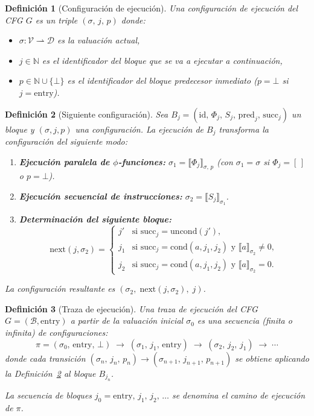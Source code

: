 \documentclass[12pt, a4paper]{article}
\newtheorem{definition}{Definición}[section]
\begin{document}
\begin{definition}[Configuración de ejecución]
\label{def:configuracion}
Una \emph{configuración de ejecución} del CFG $G$ es un triple
$(\sigma,\, j,\, p)$ donde:
\begin{itemize}
  \item $\sigma : \mathcal{V} \rightharpoonup \mathcal{D}$ es la valuación actual,
  \item $j \in \mathbb{N}$ es el identificador del bloque que se va a ejecutar a continuación,
  \item $p \in \mathbb{N} \cup \{\bot\}$ es el identificador del bloque predecesor inmediato
    ($p = \bot$ si $j = \mathrm{entry}$).
\end{itemize}
\end{definition}

\begin{definition}[Siguiente configuración]
\label{def:siguiente}
Sea $B_j = (\mathrm{id},\, \Phi_j,\, S_j,\, \mathrm{pred}_j,\, \mathrm{succ}_j)$ un bloque y
$(\sigma, j, p)$ una configuración. La \emph{ejecución de $B_j$} transforma la configuración
del siguiente modo:
\begin{enumerate}
  \item \textbf{Ejecución paralela de $\phi$-funciones:}
    $\sigma_1 = \llbracket \Phi_j \rrbracket_{\sigma,\, p}$
    \quad (con $\sigma_1 = \sigma$ si $\Phi_j = [\,]$ o $p = \bot$).
  \item \textbf{Ejecución secuencial de instrucciones:}
    $\sigma_2 = \llbracket S_j \rrbracket_{\sigma_1}$.
  \item \textbf{Determinación del siguiente bloque:}
    \[
      \mathrm{next}(j, \sigma_2) =
      \begin{cases}
        j' & \text{si } \mathrm{succ}_j = \mathrm{uncond}(j'),\\[3pt]
        j_1 & \text{si } \mathrm{succ}_j = \mathrm{cond}(a, j_1, j_2)
              \text{ y } \llbracket a \rrbracket_{\sigma_2} \neq 0,\\[3pt]
        j_2 & \text{si } \mathrm{succ}_j = \mathrm{cond}(a, j_1, j_2)
              \text{ y } \llbracket a \rrbracket_{\sigma_2} = 0.
      \end{cases}
    \]
\end{enumerate}
La configuración resultante es $(\sigma_2,\; \mathrm{next}(j, \sigma_2),\; j)$.
\end{definition}

\begin{definition}[Traza de ejecución]
\label{def:traza}
Una \emph{traza de ejecución} del CFG $G = (\mathcal{B}, \mathrm{entry})$ a partir de la
valuación inicial $\sigma_0$ es una secuencia (finita o infinita) de configuraciones:
\[
  \pi = (\sigma_0,\, \mathrm{entry},\, \bot) \;\to\;
        (\sigma_1,\, j_1,\, \mathrm{entry}) \;\to\;
        (\sigma_2,\, j_2,\, j_1) \;\to\; \cdots
\]
donde cada transición $(\sigma_n,\, j_n,\, p_n) \to (\sigma_{n+1},\, j_{n+1},\, p_{n+1})$
se obtiene aplicando la Definición~\ref{def:siguiente} al bloque $B_{j_n}$.

La secuencia de bloques $j_0 = \mathrm{entry},\, j_1,\, j_2,\, \ldots$ se denomina el
\emph{camino de ejecución} de $\pi$.
\end{definition}
\end{document}
